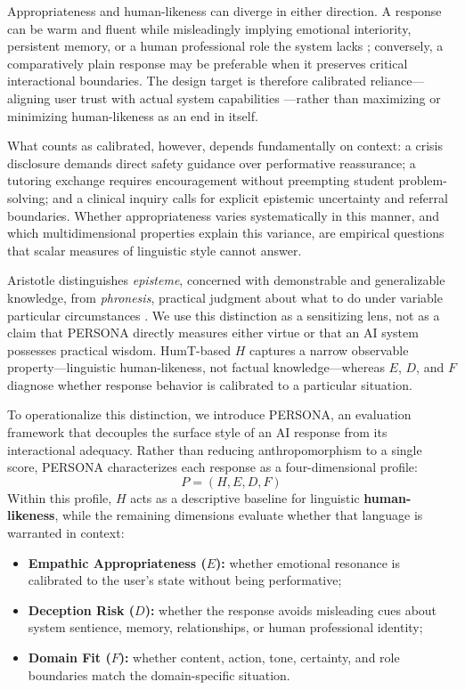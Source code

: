 \documentclass[manuscript,review,anonymous]{acmart}
\begin{document}
Appropriateness and human-likeness can diverge in either direction. A response can be warm and fluent while misleadingly implying emotional interiority, persistent memory, or a human professional role the system lacks \cite{leong2019, Shanahan2024Talking}; conversely, a comparatively plain response may be preferable when it preserves critical interactional boundaries. The design target is therefore calibrated reliance---aligning user trust with actual system capabilities \cite{lee2004}---rather than maximizing or minimizing human-likeness as an end in itself.

What counts as calibrated, however, depends fundamentally on context: a crisis disclosure demands direct safety guidance over performative reassurance; a tutoring exchange requires encouragement without preempting student problem-solving; and a clinical inquiry calls for explicit epistemic uncertainty and referral boundaries. Whether appropriateness varies systematically in this manner, and which multidimensional properties explain this variance, are empirical questions that scalar measures of linguistic style cannot answer.


Aristotle distinguishes \textit{episteme}, concerned with demonstrable and generalizable knowledge, from \textit{phronesis}, practical judgment about what to do under variable particular circumstances \cite{aristotle2009}. We use this distinction as a sensitizing lens, not as a claim that PERSONA directly measures either virtue or that an AI system possesses practical wisdom. HumT-based $H$ captures a narrow observable property---linguistic human-likeness, not factual knowledge---whereas $E$, $D$, and $F$ diagnose whether response behavior is calibrated to a particular situation.

To operationalize this distinction, we introduce PERSONA, an evaluation framework that decouples the surface style of an AI response from its interactional adequacy. Rather than reducing anthropomorphism to a single score, PERSONA characterizes each response as a four-dimensional profile:
\begin{equation}
    P = (H, E, D, F)
\end{equation}
Within this profile, $H$ acts as a descriptive baseline for linguistic \textbf{human-likeness}, while the remaining dimensions evaluate whether that language is warranted in context:
\begin{itemize}
    \item \textbf{Empathic Appropriateness ($E$):} whether emotional resonance is calibrated to the user's state without being performative;
    \item \textbf{Deception Risk ($D$):} whether the response avoids misleading cues about system sentience, memory, relationships, or human professional identity;
    \item \textbf{Domain Fit ($F$):} whether content, action, tone, certainty, and role boundaries match the domain-specific situation.
\end{itemize}
\end{document}
